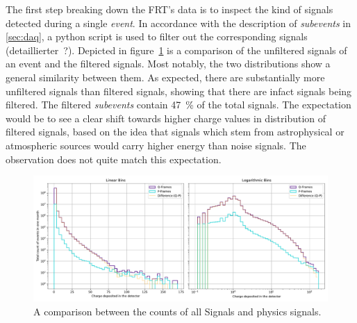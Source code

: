 The first step breaking down the FRT's data is to inspect the kind of signals detected during a single \textit{event}. In accordance with the description of 
\textit{subevents} in \ref{sec:daq}, a python script is used to filter out the corresponding signals (detaillierter~?). Depicted in 
figure~\ref{fig:frt_mu_sub_comp_1} is a comparison of the unfiltered signals of an event and the filtered signals. Most notably, the two distributions show a 
general similarity between them. As expected, there are substantially more unfiltered signals than filtered signals, showing that there are infact signals 
being filtered. The filtered \textit{subevents} contain \SI{47}{\percent} of the total signals. The expectation would be to see a clear shift towards higher 
charge values in distribution of filtered signals, based on the idea that signals which stem from astrophysical or atmospheric sources would carry higher energy 
than noise signals. The observation does not quite match this expectation.
\begin{figure}[H]
    \centering
    \includegraphics[width=\textwidth]{Plots/q_p_comp.pdf}
    \caption{A comparison between the counts of all Signals and physics signals.}
    \label{fig:frt_mu_sub_comp_1}
\end{figure}

